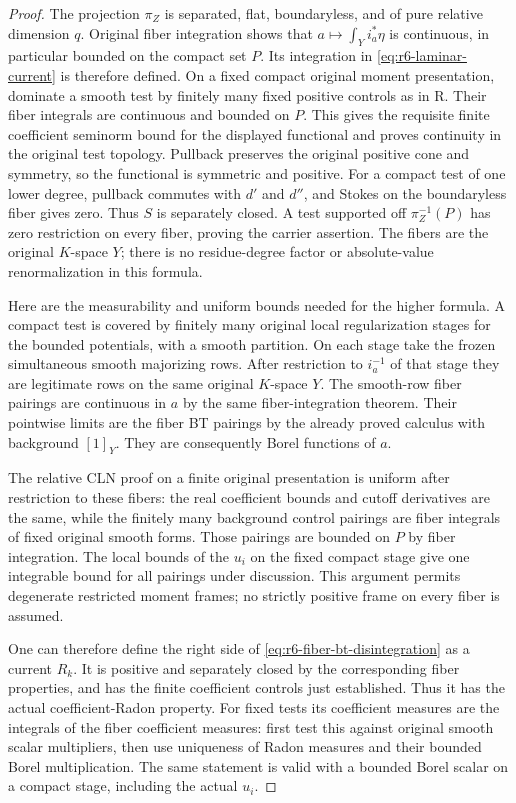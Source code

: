 \documentclass[11pt,a4paper]{article}
\numberwithin{equation}{section}
\theoremstyle{definition}
\theoremstyle{remark}
\begin{document}
\begin{proof}
The projection $\pi_Z$ is separated, flat, boundaryless, and of pure
relative dimension $q$. Original fiber integration
\cite[Theorem 16.3.3(d), pp.~447--450]{CLD25} shows that
$a\mapsto\int_Y i_a^*\eta$ is continuous, in particular bounded on
the compact set $P$. Its integration in
\eqref{eq:r6-laminar-current} is therefore defined.
On a fixed compact original moment presentation, dominate a smooth
test by finitely many fixed positive controls as in R. Their fiber
integrals are continuous and bounded on $P$. This gives the requisite
finite coefficient seminorm bound for the displayed functional and
proves continuity in the original test topology. Pullback preserves the
original positive cone and symmetry, so the functional is symmetric
and positive. For a compact test of one lower degree, pullback commutes
with $d'$ and $d''$, and Stokes on the boundaryless fiber gives zero.
Thus $S$ is separately closed. A test supported off $\pi_Z^{-1}(P)$
has zero restriction on every fiber, proving the carrier assertion.
The fibers are the original $K$-space $Y$; there is no residue-degree
factor or absolute-value renormalization in this formula.

Here are the measurability and uniform bounds needed for the higher
formula. A compact test is covered by finitely many original local
regularization stages for the bounded potentials, with a smooth
partition. On each stage take the frozen simultaneous smooth
majorizing rows. After restriction to $i_a^{-1}$ of that stage they
are legitimate rows on the same original $K$-space $Y$.
The smooth-row fiber pairings are continuous in $a$ by the same
fiber-integration theorem. Their pointwise limits are the fiber BT
pairings by the already proved calculus with background $[1]_Y$.
They are consequently Borel functions of $a$.

The relative CLN proof on a finite original presentation is uniform
after restriction to these fibers: the real coefficient bounds and
cutoff derivatives are the same, while the finitely many background
control pairings are fiber integrals of fixed original smooth forms.
Those pairings are bounded on $P$ by fiber integration. The local
bounds of the $u_i$ on the fixed compact stage give one integrable bound
for all pairings under discussion. This argument permits degenerate
restricted moment frames; no strictly positive frame on every fiber
is assumed.

One can therefore define the right side of
\eqref{eq:r6-fiber-bt-disintegration} as a current $R_k$. It is positive
and separately closed by the corresponding fiber properties, and has
the finite coefficient controls just established. Thus it has the
actual coefficient-Radon property. For fixed tests its coefficient
measures are the integrals of the fiber coefficient measures: first
test this against original smooth scalar multipliers, then use
uniqueness of Radon measures and their bounded Borel multiplication.
The same statement is valid with a bounded Borel scalar on a compact
stage, including the actual $u_i$.


\end{proof}
\end{document}
